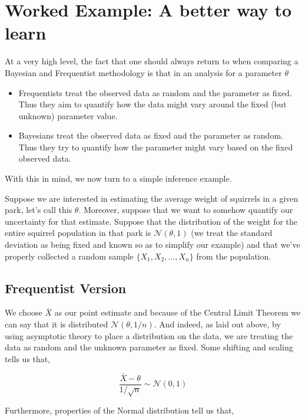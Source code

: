 \documentclass[12pt,twoside]{reedthesis}
\begin{document}
\hypertarget{worked-example-a-better-way-to-learn}{%
\section{Worked Example: A better way to learn}\label{worked-example-a-better-way-to-learn}}

At a very high level, the fact that one should always return to when comparing a Bayesian and Frequentist methodology is that in an analysis for a parameter \(\theta\)
\begin{itemize}
\item
  Frequentists treat the observed data as random and the parameter as fixed. Thus they aim to quantify how the data might vary around the fixed (but unknown) parameter value.
\item
  Bayesians treat the observed data as fixed and the parameter as random. Thus they try to quantify how the parameter might vary based on the fixed observed data.
\end{itemize}
With this in mind, we now turn to a simple inference example.

Suppose we are interested in estimating the average weight of squirrels in a given park, let's call this \(\theta\). Moreover, suppose that we want to somehow quantify our uncertainty for that estimate. Suppose that the distribution of the weight for the entire squirrel population in that park is \(\mathcal{N}(\theta, 1)\) (we treat the standard deviation as being fixed and known so as to simplify our example) and that we've properly collected a random sample \(\{X_1, X_2, ..., X_n\}\) from the population.

\hypertarget{frequentist-version}{%
\subsection{Frequentist Version}\label{frequentist-version}}

We choose \(\bar{X}\) as our point estimate and because of the Central Limit Theorem we can say that it is distributed \(\mathcal{N}(\theta, 1/n)\). And indeed, as laid out above, by using asymptotic theory to place a distribution on the data, we are treating the data as random and the unknown parameter as fixed. Some shifting and scaling tells us that,

\[
\frac{\bar{X} - \theta}{1/\sqrt{n}} \sim \mathcal{N}(0,1)
\]

Furthermore, properties of the Normal distribution tell us that,
\end{document}
